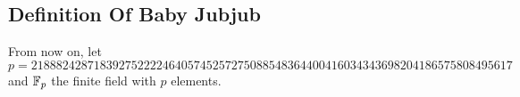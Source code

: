 \documentclass{article}
\begin{document}
\begin{spacing}{1.2}
%	
%
%	
%
%	
%	
%	
%	
%	


	\subsection{Definition Of Baby Jubjub} 
	From now on, let 
		$$	p = 21888242871839275222246405745257275088548364
				400416034343698204186575808495617 $$
	and $\mathbb{F}_p$ the finite field with $p$ elements. 
	

\end{spacing}
\end{document}
